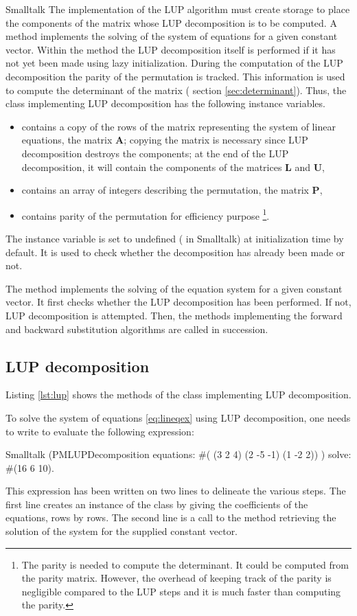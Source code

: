 \begin{displaycode}{Smalltalk}
The implementation of the LUP algorithm must create storage to
place the components of the matrix whose LUP decomposition is to
be computed. A method implements the solving of the system of
equations for a given constant vector. Within the method the LUP
decomposition itself is performed if it has not yet been made
using lazy initialization. During the computation of the LUP
decomposition the parity of the permutation is tracked. This
information is used to compute the determinant of the matrix (\cf
section \ref{sec:determinant}). Thus, the class implementing LUP
decomposition has the following instance variables.
\begin{itemize}
\item {} contains a copy of the rows of the matrix
representing the system of linear equations, \ie the matrix $\textbf{A}$; copying the matrix is necessary since LUP decomposition
destroys the components; at the end of the LUP decomposition, it
will contain the components of the matrices $\textbf{L}$ and $\textbf{U}$,
\item {} contains an array of integers describing the permutation,
\ie the matrix $\textbf{P}$,
\item {} contains parity of the permutation for efficiency purpose
\footnote{The parity is needed to compute the determinant. It
could be computed from the parity matrix. However, the overhead of
keeping track of the parity is negligible compared to the LUP
steps and it is much faster than computing the parity.}.
\end{itemize}

The instance variable  is set to undefined ( in Smalltalk) at initialization time by default.
It is used to check whether the decomposition has already been made or not.

The method  implements the solving of the equation
system for a given constant vector. It first checks whether the
LUP decomposition has been performed. If not, LUP decomposition is
attempted. Then, the methods implementing the forward and backward
substitution algorithms are called in succession.

\subsection{LUP decomposition}
Listing \ref{lst:lup} shows the methods of the class  implementing LUP decomposition.

To solve the system of equations \ref{eq:lineqex} using LUP
decomposition, one needs to write to evaluate the following
expression:
\begin{displaycode}{Smalltalk}
 (PMLUPDecomposition equations: #( (3 2 4) (2 -5 -1) (1 -2 2)) )
            solve: #(16 6 10).
\end{displaycode}
This expression has been written on two lines to delineate the
various steps. The first line creates an instance of the class
 by giving the coefficients of the
equations, rows by rows. The second line is a call to the method
 retrieving the solution of the system for the
supplied constant vector.


\end{displaycode}
